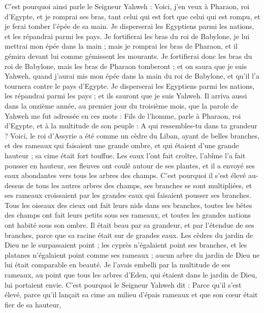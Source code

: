\begin{multicols}{2}
C'est pourquoi ainsi parle le Seigneur Yahweh : Voici, j'en veux à Pharaon, roi d'Egypte, et je romprai ses bras, tant celui qui est fort que celui qui est rompu, et je ferai tomber l'épée de sa main.
Je disperserai les Egyptiens parmi les nations, et les répandrai parmi les pays.
Je fortifierai les bras du roi de Babylone, je lui mettrai mon épée dans la main ; mais je romprai les bras de Pharaon, et il gémira devant lui comme gémissent les mourants.
Je fortifierai donc les bras du roi de Babylone, mais les bras de Pharaon tomberont ; et on saura que je suis Yahweh, quand j'aurai mis mon épée dans la main du roi de Babylone, et qu'il l'a tournera contre le pays d'Egypte.
Je disperserai les Egyptiens parmi les nations, les répandrai parmi les pays ; et ils sauront que je suis Yahweh.
\VerseOne{}Il arriva aussi dans la onzième année, au premier jour du troisième mois, que la parole de Yahweh me fut adressée en ces mots :
Fils de l'homme, parle à Pharaon, roi d'Egypte, et à la multitude de son peuple : A qui ressembles-tu dans ta grandeur ?
Voici, le roi d'Assyrie a été comme un cèdre du Liban, ayant de belles branches, et des rameaux qui faisaient une grande ombre, et qui étaient d'une grande hauteur ; sa cime était fort touffue.
Les eaux l'ont fait croître, l'abîme l'a fait pousser en hauteur, ses fleuves ont coulé autour de ses plantes, et il a envoyé ses eaux abondantes vers tous les arbres des champs.
C'est pourquoi il s'est élevé au-dessus de tous les autres arbres des champs, ses branches se sont multipliées, et ses rameaux croissaient par les grandes eaux qui faisaient pousser ses branches.
Tous les oiseaux des cieux ont fait leurs nids dans ses branches, toutes les bêtes des champs ont fait leurs petits sous ses rameaux, et toutes les grandes nations ont habité sous son ombre.
Il était beau par sa grandeur, et par l'étendue de ses branches, parce que sa racine était sur de grandes eaux.
Les cèdres du jardin de Dieu ne le surpassaient point ; les cyprès n'égalaient point ses branches, et les platanes n'égalaient point comme ses rameaux ; aucun arbre du jardin de Dieu ne lui était comparable en beauté.
Je l'avais embelli par la multitude de ses rameaux, au point que tous les arbres d'Eden, qui étaient dans le jardin de Dieu, lui portaient envie.
C'est pourquoi le Seigneur Yahweh dit : Parce qu'il s'est élevé, parce qu'il lançait sa cime au milieu d'épais rameaux et que son cœur était fier de sa hauteur,

\end{multicols}
